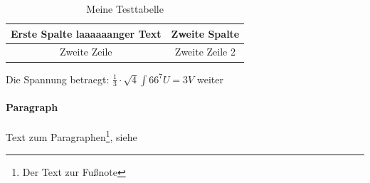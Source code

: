\begin{table}
	\centering
		\begin{tabular}{|c|c|}
	\hline
	     Erste Spalte laaaaaanger Text & Zweite Spalte \\ \hline
			Zweite Zeile & Zweite Zeile 2 \\ \hline
		\end{tabular}
	\caption{Meine Testtabelle}
	\label{tab:MeineTesttabelle}
\end{table}

Die Spannung betraegt: $\frac{1}{3}\cdot \sqrt{4} \int{6} 6^7 U=3V$ weiter


\paragraph{Paragraph}
Text zum Paragraphen\footnote{Der Text zur Fußnote}, siehe \cite{mann}